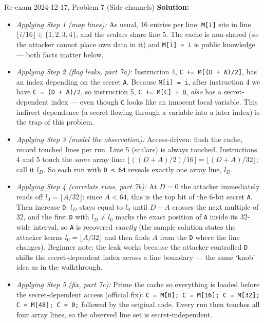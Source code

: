 \documentclass[12pt, a4paper]{article}
\begin{document}
\begin{practicebox}{Re-exam 2024-12-17, Problem 7 (Side channels)}
\textbf{Solution:}
\begin{itemize}
    \item \textit{Applying Step 1 (map lines):} As usual, 16 entries per line: \texttt{M[i]} sits in line $\lfloor i/16 \rfloor \in \{1,2,3,4\}$, and the scalars share line 5. The cache is non-shared (so the attacker cannot place own data in it) and \texttt{M[i] = i} is public knowledge --- both facts matter below.
    \item \textit{Applying Step 2 (flag leaks, part 7a):} Instruction 4, \texttt{C += M[(D + A)/2]}, has an index depending on the secret \texttt{A}. Because \texttt{M[i] = i}, after instruction 4 we have \texttt{C = (D + A)/2}, so instruction 5, \texttt{C += M[C] + B}, \emph{also} has a secret-dependent index --- even though \texttt{C} looks like an innocent local variable. This indirect dependence (a secret flowing through a variable into a later index) is the trap of this problem.
    \item \textit{Applying Step 3 (model the observation):} Access-driven: flush the cache, record touched lines per run. Line 5 (scalars) is always touched. Instructions 4 and 5 touch the \emph{same} array line: $\lfloor ((D + A)/2)/16 \rfloor = \lfloor (D + A)/32 \rfloor$; call it $l_D$. So each run with \texttt{D < 64} reveals exactly one array line, $l_D$.
    \item \textit{Applying Step 4 (correlate runs, part 7b):} At $D = 0$ the attacker immediately reads off $l_0 = \lfloor A/32 \rfloor$: since $A < 64$, this is the top bit of the 6-bit secret \texttt{A}. Then increase \texttt{D}: $l_D$ stays equal to $l_0$ until $D + A$ crosses the next multiple of 32, and the first \texttt{D} with $l_D \neq l_0$ marks the exact position of \texttt{A} inside its 32-wide interval, so \texttt{A} is recovered \emph{exactly} (the sample solution states the attacker learns $l_0 = \lfloor A/32 \rfloor$ and then finds $A$ from the \texttt{D} where the line changes). Beginner note: the leak works because the attacker-controlled \texttt{D} shifts the secret-dependent index across a line boundary --- the same `knob' idea as in the walkthrough.
    \item \textit{Applying Step 5 (fix, part 7c):} Prime the cache so everything is loaded before the secret-dependent access (official fix): \texttt{C = M[0]; C = M[16]; C = M[32]; C = M[48]; C = 0;} followed by the original code. Every run then touches all four array lines, so the observed line set is secret-independent.

\end{itemize}
\end{practicebox}
\end{document}
